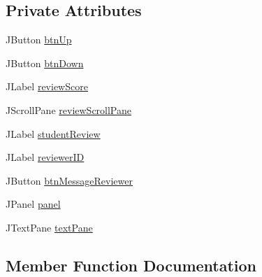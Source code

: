 \subsection*{Private Attributes}
\begin{DoxyCompactItemize}
\item 
J\+Button \mbox{\hyperlink{classcom_1_1_b_n_u_1_1pages_1_1teacher__review_1_1_review_model_a6550648a32ea3b7c03a528d8606e66f6}{btn\+Up}}
\item 
J\+Button \mbox{\hyperlink{classcom_1_1_b_n_u_1_1pages_1_1teacher__review_1_1_review_model_acf8e32a693c699a947da47af6c5089fb}{btn\+Down}}
\item 
J\+Label \mbox{\hyperlink{classcom_1_1_b_n_u_1_1pages_1_1teacher__review_1_1_review_model_afdb4ea08dcea2b78d5c9b81a6a5ca677}{review\+Score}}
\item 
J\+Scroll\+Pane \mbox{\hyperlink{classcom_1_1_b_n_u_1_1pages_1_1teacher__review_1_1_review_model_a8573efe161b80c8adc42bd165f2b32b4}{review\+Scroll\+Pane}}
\item 
J\+Label \mbox{\hyperlink{classcom_1_1_b_n_u_1_1pages_1_1teacher__review_1_1_review_model_aaf294efaab72da36b5af55c55015128c}{student\+Review}}
\item 
J\+Label \mbox{\hyperlink{classcom_1_1_b_n_u_1_1pages_1_1teacher__review_1_1_review_model_ac686e5846bf39f0715af55ac066575eb}{reviewer\+ID}}
\item 
J\+Button \mbox{\hyperlink{classcom_1_1_b_n_u_1_1pages_1_1teacher__review_1_1_review_model_a5724f6cfb3dae50626ab9e0204a35223}{btn\+Message\+Reviewer}}
\item 
J\+Panel \mbox{\hyperlink{classcom_1_1_b_n_u_1_1pages_1_1teacher__review_1_1_review_model_aeed35cfb76817f49258ef3b5691924b5}{panel}}
\item 
J\+Text\+Pane \mbox{\hyperlink{classcom_1_1_b_n_u_1_1pages_1_1teacher__review_1_1_review_model_a4fc16baa5ddf9da68c6a6bc189d829d5}{text\+Pane}}
\end{DoxyCompactItemize}


\subsection{Member Function Documentation}
\mbox{\label{classcom_1_1_b_n_u_1_1pages_1_1teacher__review_1_1_review_model_a0b600b8b4ede2d1337dcacce46ca4632}} 
